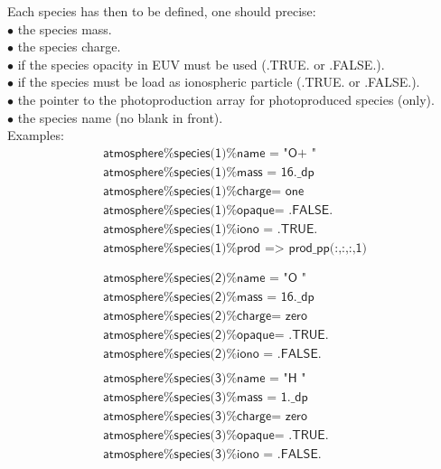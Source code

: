 \documentclass{article}
\begin{document}
Each species has then to be defined, one should precise:\\
$\bullet$ the species mass.\\
$\bullet$ the species charge.\\
$\bullet$ if the species opacity in EUV must be used (.TRUE. or .FALSE.).\\
$\bullet$ if the species must be load as ionospheric particle (.TRUE. or .FALSE.).\\
$\bullet$ the pointer to the photoproduction array for photoproduced species (only).\\
$\bullet$ the species name (no blank in front).\\
Examples:
\[
\begin{array}{l}
  \textsf{atmosphere\%species(1)\%name  = "O+        "}\\
  \textsf{atmosphere\%species(1)\%mass  = 16.\_dp}\\
  \textsf{atmosphere\%species(1)\%charge= one}\\
  \textsf{atmosphere\%species(1)\%opaque= .FALSE.}\\
  \textsf{atmosphere\%species(1)\%iono  = .TRUE.}\\
  \textsf{atmosphere\%species(1)\%prod  =$>$ prod\_pp(:,:,:,1)}\\
  \textsf{}\\
  \textsf{}\\
  \textsf{atmosphere\%species(2)\%name  = "O         "}\\
  \textsf{atmosphere\%species(2)\%mass  = 16.\_dp}\\
  \textsf{atmosphere\%species(2)\%charge= zero}\\
  \textsf{atmosphere\%species(2)\%opaque= .TRUE.}\\
  \textsf{atmosphere\%species(2)\%iono  = .FALSE.}
  \textsf{}\\
  \textsf{}\\
  \textsf{atmosphere\%species(3)\%name  = "H         "}\\
  \textsf{atmosphere\%species(3)\%mass  = 1.\_dp}\\
  \textsf{atmosphere\%species(3)\%charge= zero}\\
  \textsf{atmosphere\%species(3)\%opaque= .TRUE.}\\
  \textsf{atmosphere\%species(3)\%iono  = .FALSE.}
\end{array}
\]\\
\end{document}
